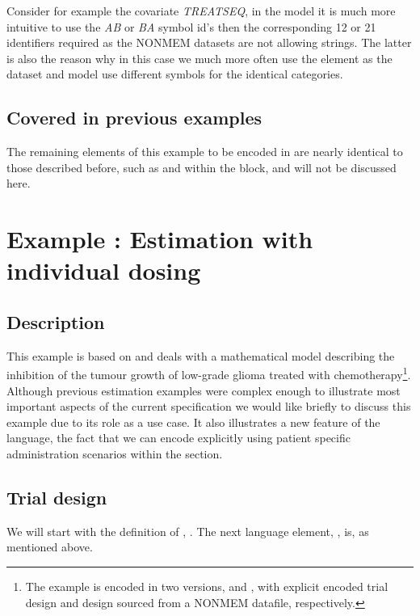 Consider for example the covariate \emph{TREATSEQ}, in the model it is 
much more intuitive to use the \emph{AB} or \emph{BA} symbol id's then 
the corresponding 12 or 21 identifiers required as the NONMEM datasets 
are not allowing strings. The latter is also the reason why in this case we much
more often use the  element as the dataset and model
use different symbols for the identical categories.

\subsection{Covered in previous examples}
The remaining elements of this example to be encoded in \pharmml
are nearly identical to those described before, such as 
and  within the  block,
and will not be discussed here.

\section{Example \theexamples: Estimation with individual dosing}
\label{sec:Ribba}

\subsection{Description}
This example is based on \cite{Ribba:2012uq} and deals with a mathematical
model describing the inhibition of the tumour growth of low-grade glioma treated
with chemotherapy\footnote{The example is encoded in two versions,  
 and , with explicit encoded trial 
design and design sourced from a NONMEM datafile, respectively.}. 
Although previous estimation examples were complex
enough to illustrate most important aspects of the current \pharmml specification 
we would like briefly to discuss this example due to its role as a use case. It also 
illustrates a new feature of the language, the fact that we can encode explicitly 
using patient specific administration scenarios within the  section.


\subsection{Trial design}
We will start with the definition of , . The next language element, 
, is, as mentioned above.

